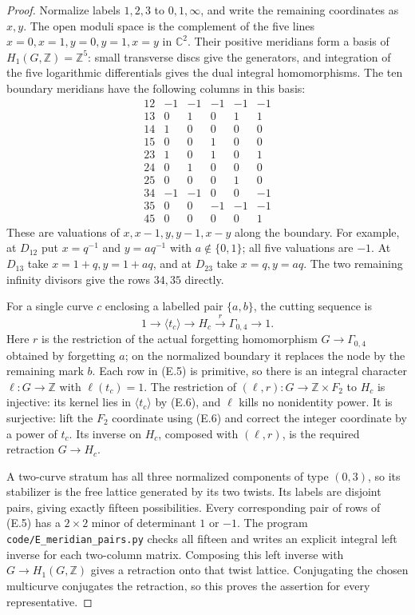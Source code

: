 \begin{proof}
Normalize labels $1,2,3$ to $0,1,\infty$, and write the remaining
coordinates as $x,y$.  The open moduli space is the complement of
the five lines
$x=0,x=1,y=0,y=1,x=y$ in $\mathbb C^2$.
Their positive meridians form a basis of $H_1(G,\mathbb Z)=\mathbb Z^5$:
small transverse discs give the generators, and integration of the
five logarithmic differentials gives the dual integral homomorphisms.
The ten boundary meridians have the following columns in this basis:
\[
\begin{array}{c|rrrrr}
12&-1&-1&-1&-1&-1\\
13&0&1&0&1&1\\
14&1&0&0&0&0\\
15&0&0&1&0&0\\
23&1&0&1&0&1\\
24&0&1&0&0&0\\
25&0&0&0&1&0\\
34&-1&-1&0&0&-1\\
35&0&0&-1&-1&-1\\
45&0&0&0&0&1
\end{array}                                                   \tag{E.5}
\]
These are valuations of $x,x-1,y,y-1,x-y$ along the boundary.
For example, at $D_{12}$ put $x=q^{-1}$ and $y=a q^{-1}$ with
$a\notin\{0,1\}$; all five valuations are $-1$.
At $D_{13}$ take $x=1+q,y=1+aq$, and at $D_{23}$ take
$x=q,y=aq$.  The two remaining infinity divisors give the rows
$34,35$ directly.

For a single curve $c$ enclosing a labelled pair $\{a,b\}$,
the cutting sequence is
\[
1\longrightarrow\langle t_c\rangle\longrightarrow H_c
 \xrightarrow{r}\Gamma_{0,4}\longrightarrow1.               \tag{E.6}
\]
Here $r$ is the restriction of the actual forgetting homomorphism
$G\to\Gamma_{0,4}$ obtained by forgetting $a$; on the normalized
boundary it replaces the node by the remaining mark $b$.
Each row in (E.5) is primitive, so there is an integral character
$\ell:G\to\mathbb Z$ with $\ell(t_c)=1$.
The restriction of $(\ell,r):G\to\mathbb Z\times F_2$ to $H_c$
is injective: its kernel lies in $\langle t_c\rangle$ by (E.6),
and $\ell$ kills no nonidentity power.  It is surjective: lift the
$F_2$ coordinate using (E.6) and correct the integer coordinate by
a power of $t_c$.  Its inverse on $H_c$, composed with $(\ell,r)$,
is the required retraction $G\to H_c$.

A two-curve stratum has all three normalized components of type
$(0,3)$, so its stabilizer is the free lattice generated by its two
twists.  Its labels are disjoint pairs, giving exactly fifteen
possibilities.  Every corresponding pair of rows of (E.5) has a
$2\times2$ minor of determinant $1$ or $-1$.  The program
\texttt{code/E\_meridian\_pairs.py} checks all fifteen and writes an
explicit integral left inverse for each two-column matrix.  Composing
this left inverse with $G\to H_1(G,\mathbb Z)$ gives a retraction
onto that twist lattice.  Conjugating the chosen multicurve conjugates
the retraction, so this proves the assertion for every representative.


\end{proof}
